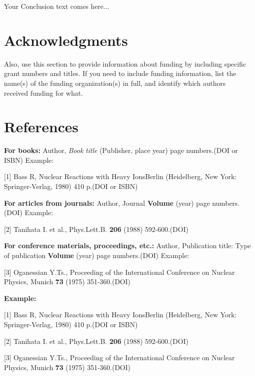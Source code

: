 \documentclass[12pt,a4paper,twoside]{article}
\begin{document}
Your Conclusion text comes here...

\section*{Acknowledgments }


Also, use this section to provide information about funding by including specific grant numbers and titles. If you need to include funding information, list the name(s) of the funding organization(s) in full, and identify which authors received funding for what.

\section*{References }

\textbf{For books: }
Author, \textit{Book title} (Publisher, place year) page numbers.(DOI or ISBN) Example:

[1]	Bass R, Nuclear Reactions with Heavy IonsBerlin (Heidelberg, New York: Springer-Verlag, 1980) 410 p.(DOI or ISBN)

\textbf{For articles from journals:}
Author, Journal \textbf{Volume} (year) page numbers.(DOI) Example:

[2] Tanihata I. et al., Phys.Lett.B. \textbf{206} (1988) 592-600.(DOI)

\textbf{For conference materials, proceedings, etc.:}
Author, Publication title: Type of publication \textbf{Volume} (year) page numbers.(DOI) Example:

[3] Oganessian Y.Ts., Proceeding of the International Conference on Nuclear Physics, Munich \textbf{73} (1975) 351-360.(DOI)

\begin{flushleft}
\textbf{Example: }


[1] Bass R, Nuclear Reactions with Heavy IonsBerlin (Heidelberg, New York: Springer-Verlag, 1980) 410 p.(DOI or ISBN)

[2] Tanihata I. et al., Phys.Lett.B. \textbf{206} (1988) 592-600.(DOI)

[3] Oganessian Y.Ts., Proceeding of the International Conference on Nuclear Physics, Munich \textbf{73} (1975) 351-360.(DOI)

\end{flushleft}
\end{document}
